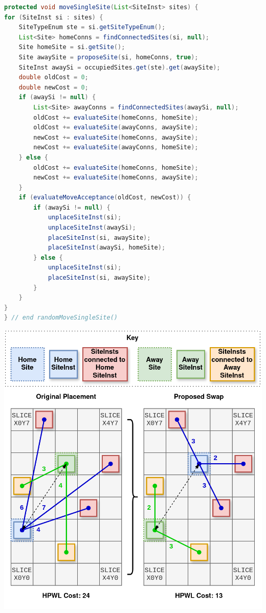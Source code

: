 \begin{lstlisting}[language=java, caption={Single Site Movement}, label={lst:sa_move_single}]
protected void moveSingleSite(List<SiteInst> sites) {
for (SiteInst si : sites) {
    SiteTypeEnum ste = si.getSiteTypeEnum();
    List<Site> homeConns = findConnectedSites(si, null);
    Site homeSite = si.getSite();
    Site awaySite = proposeSite(si, homeConns, true);
    SiteInst awaySi = occupiedSites.get(ste).get(awaySite);
    double oldCost = 0;
    double newCost = 0;
    if (awaySi != null) {
        List<Site> awayConns = findConnectedSites(awaySi, null);
        oldCost += evaluateSite(homeConns, homeSite);
        oldCost += evaluateSite(awayConns, awaySite);
        newCost += evaluateSite(homeConns, awaySite);
        newCost += evaluateSite(awayConns, homeSite);
    } else {
        oldCost += evaluateSite(homeConns, homeSite);
        newCost += evaluateSite(homeConns, awaySite);
    }
    if (evaluateMoveAcceptance(oldCost, newCost)) {
        if (awaySi != null) {
            unplaceSiteInst(si);
            unplaceSiteInst(awaySi);
            placeSiteInst(si, awaySite);
            placeSiteInst(awaySi, homeSite);
        } else {
            unplaceSiteInst(si);
            placeSiteInst(si, awaySite);
        }
    }
}
} // end randomMoveSingleSite()
\end{lstlisting}

{
    \centering
    \includegraphics[width=0.9\columnwidth]{figures/placement/swapSingleSite.png}
    \label{fig:swapSingleSite}
}

